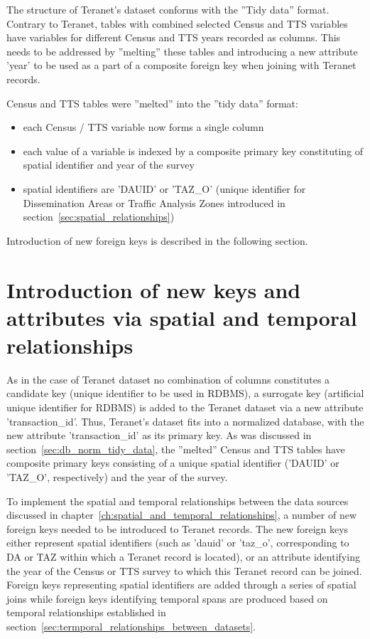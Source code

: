 \vspace{5mm}

The structure of Teranet's dataset conforms with the ''Tidy data'' format.
Contrary to Teranet, tables with combined selected Census and TTS variables have variables for different Census and TTS years recorded as columns.
This needs to be addressed by ''melting'' these tables and introducing a new attribute 'year' to be used as a part of a composite foreign key when joining with Teranet records.

\vspace{5mm}

Census and TTS tables were ''melted'' into the ''tidy data'' format:
\begin{itemize}
    \item each Census / TTS variable now forms a single column
    \item each value of a variable is indexed by a composite primary key constituting of spatial identifier and year of the survey
    \item spatial identifiers are 'DAUID' or 'TAZ\_O' (unique identifier for Dissemination Areas or Traffic Analysis Zones introduced in section~\ref{sec:spatial_relationships})
\end{itemize}

Introduction of new foreign keys is described in the following section.

\section{Introduction of new keys and attributes via spatial and temporal relationships} \label{sec:introduction_of_new_keys}

As in the case of Teranet dataset no combination of columns constitutes a candidate key (unique identifier to be used in RDBMS), a surrogate key (artificial unique identifier for RDBMS) is added to the Teranet dataset via a new attribute 'transaction\_id'.
Thus, Teranet's dataset fits into a normalized database, with the new attribute 'transaction\_id' as its primary key.
As was discussed in section~\ref{sec:db_norm_tidy_data}, the ''melted'' Census and TTS tables have composite primary keys consisting of a unique spatial identifier ('DAUID' or 'TAZ\_O', respectively) and the year of the survey.

To implement the spatial and temporal relationships between the data sources discussed in chapter~\ref{ch:spatial_and_temporal_relationships}, a number of new foreign keys needed to be introduced to Teranet records.
The new foreign keys either represent spatial identifiers (such as 'dauid' or 'taz\_o', corresponding to DA or TAZ within which a Teranet record is located), or an attribute identifying the year of the Census or TTS survey to which this Teranet record can be joined.
Foreign keys representing spatial identifiers are added through a series of spatial joins while foreign keys identifying temporal spans are produced based on temporal relationships established in section~\ref{sec:termporal_relationships_between_datasets}.

